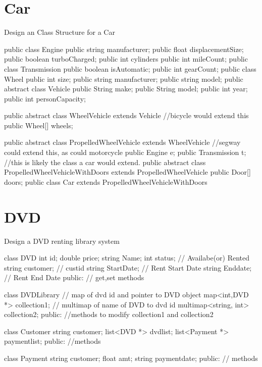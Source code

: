 \section{Car}
Design an Class Structure for a Car

\begin{Code}
	public class Engine{
		public string manufacturer;
		public float displacementSize;
		public boolean turboCharged;
		public int cylinders
		public int mileCount;
	}
	public class Transmission{
		public boolean isAutomatic;
		public int gearCount;
	}
	public class Wheel{
		public int size;
		public string manufacturer;
		public string model;
	}
	public abstract class Vehicle{
		public String make;
		public String model;
		public int year;
		public int personCapacity;
	}
	
	public abstract class WheelVehicle extends Vehicle //bicycle would extend this{
		public Wheel[] wheels;
	}
	
	public abstract class PropelledWheelVehicle extends WheelVehicle //segway could extend this, as could motorcycle{
		public Engine e;
		public Transmission t;
	}
	//this is likely the class a car would extend.
	public abstract class PropelledWheelVehicleWithDoors extends PropelledWheelVehicle{
		public Door[] doors;
	}
	public class Car extends PropelledWheelVehicleWithDoors{
		
	}
\end{Code}

\section{DVD}
Design a DVD renting library system

\begin{Code}
	class DVD{
		int id;
		double price;
		string  Name;
		int  status;  // Availabe(or) Rented
		string customer; // custid
		string  StartDate; // Rent Start Date
		string  Enddate;  // Rent End Date		
	public:
		// get,set methods
	}
	
	class DVDLibrary{
		// map of dvd id and pointer to DVD object
		map<int,DVD *>   collection1;
		// multimap of name of DVD to dvd id
		multimap<string,	int>   collection2;
	public:
		//methods to modify collection1 and collection2
	}
	
	class Customer{
		string customer;
		list<DVD *>   dvdlist;
		list<Payment *> paymentlist;	
	public:
		//methods
	}
	
	class Payment{
		string customer;
		float  amt;
		string paymentdate;
	public:
		// methods
	}
\end{Code}

